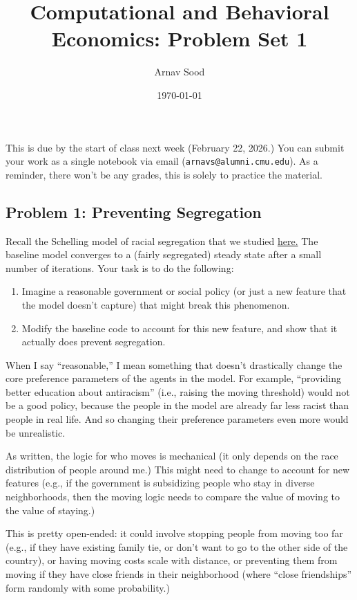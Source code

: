 \documentclass[10pt, oneside]{amsart}
\title{Computational and Behavioral Economics: Problem Set 1}
\author{Arnav Sood}
\date{\today}
\DeclareMathOperator{\1}{\mathbbm{1}}
\newcommand{\blue}{\color{blue}}
\begin{document}
\maketitle

This is due by the start of class next week (February 22, 2026.) You can submit your work as a single notebook via email (\texttt{arnavs@alumni.cmu.edu}). As a reminder, there won't be any grades, this is solely to practice the material.

\subsection*{Problem 1: Preventing Segregation}

Recall the Schelling model of racial segregation that we studied \href{https://julia.quantecon.org/multi_agent_models/schelling.html}{\blue here.} The baseline model converges to a (fairly segregated) steady state after a small number of iterations. Your task is to do the following: 

\begin{enumerate}
    \item Imagine a reasonable government or social policy (or just a new feature that the model doesn't capture) that might break this phenomenon. 
    \item Modify the baseline code to account for this new feature, and show that it actually does prevent segregation. 
\end{enumerate}

When I say ``reasonable,'' I mean something that doesn't drastically change the core preference parameters of the agents in the model. For example, ``providing better education about antiracism'' (i.e., raising the moving threshold) would not be a good policy, because the people in the model are already far less racist than people in real life. And so changing their preference parameters even more would be unrealistic. 

As written, the logic for who moves is mechanical (it only depends on the race distribution of people around me.) This might need to change to account for new features (e.g., if the government is subsidizing people who stay in diverse neighborhoods, then the moving logic needs to compare the value of moving to the value of staying.)

This is pretty open-ended: it could involve stopping people from moving too far (e.g., if they have existing family tie, or don't want to go to the other side of the country), or having moving costs scale with distance, or preventing them from moving if they have close friends in their neighborhood (where ``close friendships'' form randomly with some probability.) 
\end{document}
